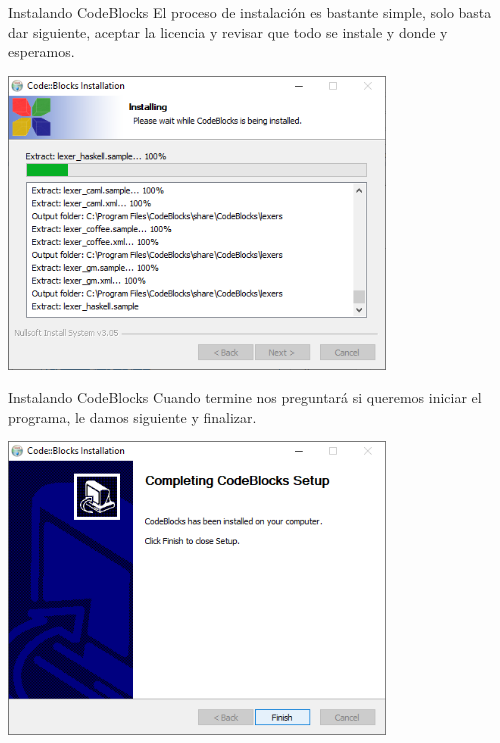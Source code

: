 \documentclass[11pt]{beamer}
\begin{document}
\begin{frame}{Instalando CodeBlocks}
    \justifying
    El proceso de instalación es bastante simple, solo basta dar siguiente, aceptar la licencia y revisar que todo se instale y donde y esperamos.
    
    \centering
    \includegraphics[width=0.75\textwidth]{cb11.png}
\end{frame}
\begin{frame}{Instalando CodeBlocks}
    \justifying
    Cuando termine nos preguntará si queremos iniciar el programa, le damos siguiente y finalizar.
    
    \centering
    \includegraphics[width=0.75\textwidth]{cb14.png}
\end{frame}
\end{document}
